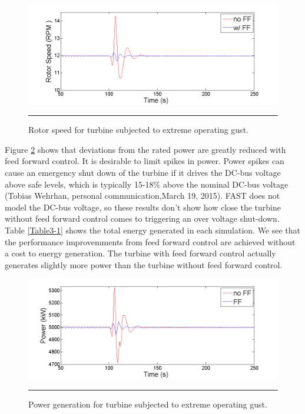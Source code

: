 \begin{figure}[htbp]
	\centering
		\includegraphics[trim = {1cm 0 2cm 0}, clip, width = \linewidth]{Figures/ch3Figures/fig3-14.png}
		\rule{35em}{0.5pt}
	\caption{Rotor speed for turbine subjected to extreme operating gust. }
	\label{fig3-14}
\end{figure}

Figure \ref{fig3-15} shows that deviations from the rated power are greatly reduced with feed forward control. It is desirable to limit spikes in power. Power spikes can cause an emergency shut down of the turbine if it drives the DC-bus voltage above safe levels, which is typically 15-18$\%$ above the nominal DC-bus voltage (Tobias Wehrhan, personal communication,March 19, 2015). FAST does not model the DC-bus voltage, so these results don't show how close the turbine without feed forward control comes to triggering an over voltage shut-down. Table \ref{Table3-1} shows the total energy generated in each simulation. We see that the performance improvemments from feed forward control are achieved without a cost to energy generation. The turbine with feed forward control actually generates slightly more power than the turbine without feed forward control.


\begin{figure}[htbp]
	\centering
		\includegraphics[trim = {1cm 0 2cm 0}, clip, width = \linewidth]{Figures/ch3Figures/fig3-15.png}
		\rule{35em}{0.5pt}
	\caption{Power generation for turbine subjected to extreme operating gust.}
	\label{fig3-15}
\end{figure}

